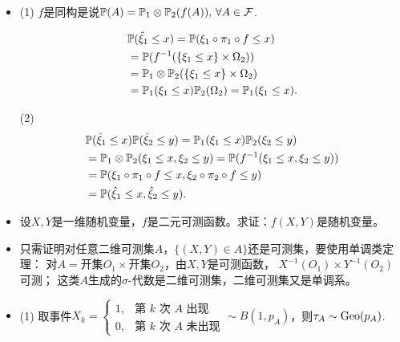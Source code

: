\begin{itemize}
    \item[$\boxed{解答}$]
    (1) $f$是同构是说$\mathbb{P}(A)=\mathbb{P}_1\otimes\mathbb{P}_2(f(A)),\,\forall A\in\mathcal{F}$.
    \begin{align*}&\mathbb{P}(\hat{\xi}_1\le x)=\mathbb{P}(\xi_1\circ\pi_1\circ f\le x)\\
    &=\mathbb{P}(f^{-1}(\{\xi_1\le x\}\times\Omega_2))\\
    &=\mathbb{P}_1\otimes\mathbb{P}_2(\{\xi_1\le x\}\times\Omega_2)\\
    &=\mathbb{P}_1(\xi_1\le x)\mathbb{P}_2(\Omega_2)=\mathbb{P}_1(\xi_1\le x).\end{align*}

    (2)\begin{align*}&\mathbb{P}(\hat{\xi}_1\le x)\mathbb{P}(\hat{\xi}_2\le y)
    =\mathbb{P}_1(\xi_1\le x)\mathbb{P}_2(\xi_2\le y)\\
    &=\mathbb{P}_1\otimes\mathbb{P}_2(\xi_1\le x,\xi_2\le y)
    =\mathbb{P}(f^{-1}(\xi_1\le x,\xi_2\le y))\\
    &=\mathbb{P}(\xi_1\circ\pi_1\circ f\le x,\xi_2\circ\pi_2\circ f\le y)\\
    &=\mathbb{P}(\hat{\xi}_1\le x,\hat{\xi}_2\le y).\end{align*}

    \item[$\boxed{习题}$]
    设$X,Y$是一维随机变量，$f$是二元可测函数。求证：$f(X,Y)$是随机变量。

    \item[$\boxed{解答}$]
    只需证明对任意二维可测集$A$，$\{(X,Y)\in A\}$还是可测集，要使用单调类定理：
    对$A=$开集$O_1\times$开集$O_2$，由$X,Y$是可测函数，
    $X^{-1}(O_1)\times Y^{-1}(O_2)$可测；
    这类$A$生成的$\sigma$-代数是二维可测集，二维可测集又是单调系。

    \item[5.27]
    (1) 取事件$X_k=\begin{cases}1,&\text{第 }k\text{ 次 }A\text{ 出现}\\
        0,&\text{第 }k\text{ 次 }A\text{ 未出现}\end{cases}
    \sim B(1,p_A)$，则$\tau_A\sim\operatorname{Geo}(p_A)$.


\end{itemize}
